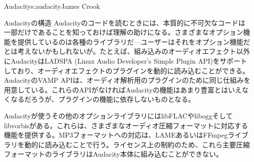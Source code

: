 \begin{aosachapter}{Audacity}{s:audacity}{James Crook}
\begin{aosasect1}{Audacityの構造}
Audacityのコードを読むときには、本質的に不可欠なコードは一部だけであることを知っておけば理解の助けになる。さまざまなオプション機能を提供しているのは各種のライブラリだ---ユーザーはそれをオプション機能だとは考えないかもしれないが。たとえば、組み込みのオーディオエフェクト以外にAudacityはLADSPA (Linux Audio Developer's Simple Plugin API)をサポートしており、オーディオエフェクトのプラグインを動的に読み込むことができる。AudacityのVAMP APIは、オーディオ解析用のプラグインのために同じ仕組みを用意している。これらのAPIがなければAudacityの機能はあまり豊富とはいえなくなるだろうが、プラグインの機能に依存しないものとなる。

Audacityが使うその他のオプションライブラリにはlibFLACやliboggそしてlibvorbisがある。これらは、さまざまなオーディオ圧縮フォーマットに対応する機能を提供する。MP3フォーマットへの対応は、LAMEあるいはFFmpegライブラリを動的に読み込むことで行う。ライセンス上の制約のため、これら主要圧縮フォーマットのライブラリはAudacity本体に組み込むことができない。


\end{aosasect1}
\end{aosachapter}
